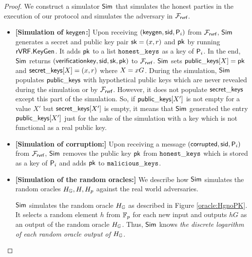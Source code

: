 \begin{proof}
	We construct a simulator $ \mathsf{Sim} $ that simulates the honest parties in the execution of our protocol and simulates the adversary in $ \mathcal{F}_{\textsf{rvrf}} $. 
	\begin{itemize}
		
		\item \textbf{[Simulation of $ \mathsf{keygen} $:]} Upon receiving $(\mathsf{keygen}, \textsf{sid}, \mathsf{P}_i)$ from $\mathcal{F}_{\textsf{rvrf}}$, $ \mathsf{Sim} $ generates  a secret and public key pair $ \mathsf{sk} = (x,r)$ and $\mathsf{pk} $ by running $ {\mathsf{rVRF}}.{\mathsf{KeyGen}} $. It adds $ \mathsf{pk} $ to a list $ \mathtt{honest\_keys} $  as a key of $ \mathsf{P}_i $.
		In the end, $ \mathsf{Sim} $ returns $(\mathsf{verificationkey}, \textsf{sid}, \mathsf{sk},\mathsf{pk})$ to $\mathcal{F}_{\textsf{rvrf}}$. 
		$ \mathsf{Sim} $ sets $ {\mathsf{public\_keys}}[X] = \mathsf{pk}$ and $ {\mathsf{secret\_keys}}[X] =(x,r) $ where $ X = x G $.
		During the simulation, $ \mathsf{Sim} $ populates $ {\mathsf{public\_keys}} $ with hypothetical public keys which are never revealed during the simulation or by $ \mathcal{F}_{\textsf{rvrf}} $. However, it does not populate $ {\mathsf{secret\_keys}} $ except this part of the simulation. So, if  $ {\mathsf{public\_keys}}[X'] $ is not empty for a value $ X' $ but $ {\mathsf{secret\_keys}}[X'] $ is empty, it means that $ \mathsf{Sim} $ generated the entry $ {\mathsf{public\_keys}}[X'] $ just for the sake of the simulation with a key which is not  functional as a real public key.
		
		\item \textbf{[Simulation of corruption:]} Upon receiving a message $ (\mathsf{corrupted}, \textsf{sid}, \mathsf{P}_i) $ from $ \mathcal{F}_{\textsf{rvrf}} $, $ \mathsf{Sim} $ removes the public key $ \mathsf{pk} $ from $ \mathtt{honest\_keys} $ which is stored as a key of $ \mathsf{P}_i $ and adds $ \mathsf{pk} $ to $ \mathtt{malicious\_keys} $.
		
		\item\textbf{[Simulation of the random oracles:]} We  describe how $ \mathsf{Sim} $ simulates the random oracles $ H_{\mathbb{G}}, H, H_p $ against the real world adversaries. 	
		
		$ \mathsf{Sim} $ simulates the random oracle $ H_{\mathbb{G}} $ as described in Figure \ref{oracle:HgnoPK}. It selects a random element  $ h $ from $ \mathbb{F}_p $ for each new input and outputs $ hG $ as an output of the random oracle $ H_{\mathbb{G}} $. Thus, $ \mathsf{Sim} $ knows \emph{the discrete logarithm of each random oracle output of $H_{\mathbb{G}}  $}. 
		

\end{itemize}
\end{proof}
